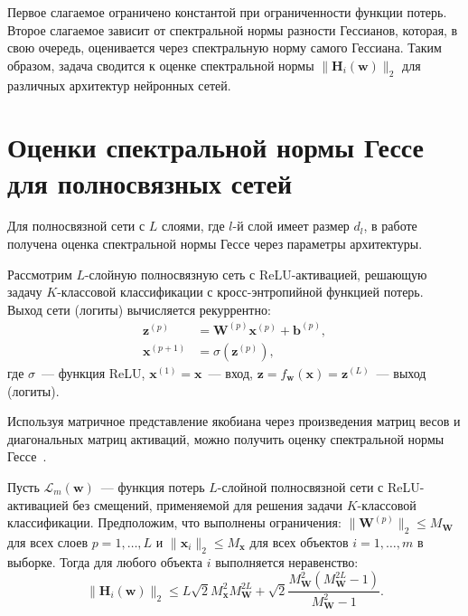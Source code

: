 Первое слагаемое ограничено константой при ограниченности функции потерь. Второе слагаемое зависит от спектральной нормы разности Гессианов, которая, в свою очередь, оценивается через спектральную норму самого Гессиана. Таким образом, задача сводится к оценке спектральной нормы $\|\mathbf{H}_i(\mathbf{w})\|_2$ для различных архитектур нейронных сетей.

\section{Оценки спектральной нормы Гессе для полносвязных сетей}

Для полносвязной сети с $L$ слоями, где $l$-й слой имеет размер $d_l$, в работе~\cite{kiselev2024unraveling} получена оценка спектральной нормы Гессе через параметры архитектуры.

Рассмотрим $L$-слойную полносвязную сеть с ReLU-активацией, решающую задачу $K$-классовой классификации с кросс-энтропийной функцией потерь. Выход сети (логиты) вычисляется рекуррентно:
\begin{align*}
\mathbf{z}^{(p)} &= \mathbf{W}^{(p)} \mathbf{x}^{(p)} + \mathbf{b}^{(p)}, \\
\mathbf{x}^{(p+1)} &= \sigma(\mathbf{z}^{(p)}),
\end{align*}
где $\sigma$~--- функция ReLU, $\mathbf{x}^{(1)} = \mathbf{x}$~--- вход, $\mathbf{z} = f_{\mathbf{w}}(\mathbf{x}) = \mathbf{z}^{(L)}$~--- выход (логиты).

Используя матричное представление якобиана через произведения матриц весов и диагональных матриц активаций, можно получить оценку спектральной нормы Гессе~\cite{kiselev2024unraveling}.

\begin{theorem}\label{th:mlp-hessian}
Пусть $\mathcal{L}_m(\mathbf{w})$~--- функция потерь $L$-слойной полносвязной сети с ReLU-активацией без смещений, применяемой для решения задачи $K$-классовой классификации. Предположим, что выполнены ограничения: $\|\mathbf{W}^{(p)}\|_2 \leqslant M_{\mathbf{W}}$ для всех слоев $p = 1, \ldots, L$ и $\|\mathbf{x}_i\|_2 \leqslant M_{\mathbf{x}}$ для всех объектов $i = 1, \ldots, m$ в выборке. Тогда для любого объекта $i$ выполняется неравенство:
\begin{equation}
\label{eq:mlp-hessian-bound}
\|\mathbf{H}_i(\mathbf{w})\|_2 \leqslant L \sqrt{2} M_{\mathbf{x}}^2 M_{\mathbf{W}}^{2L} + \sqrt{2} \frac{M_{\mathbf{W}}^2 (M_{\mathbf{W}}^{2L} - 1)}{M_{\mathbf{W}}^2 - 1}.
\end{equation}
\end{theorem}

